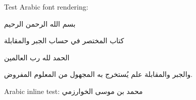 \documentclass[11pt]{article}
\newcommand{\ar}[1]{{\arabicfont\beginR #1\endR}}
\begin{document}
Test Arabic font rendering:

\ar{بسم الله الرحمن الرحيم}

\ar{كتاب المختصر في حساب الجبر والمقابلة}

\ar{الحمد لله رب العالمين}

\begin{Arabic}
والجبر والمقابلة علم يُستخرج به المجهول من المعلوم المفروض.
\end{Arabic}

Arabic inline test: \ar{محمد بن موسى الخوارزمي}
\end{document}
